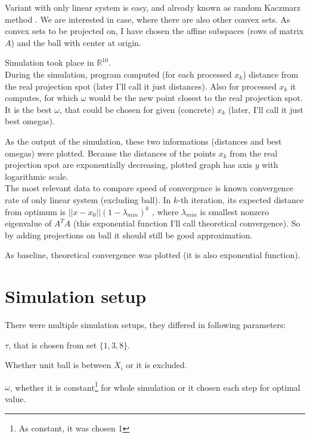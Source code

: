 \documentclass[11pt]{book}
\newcommand{\R}{\mathbb{R}}
\begin{document}
Variant with only linear system is easy, and already known as random Kaczmarz method \cite{kaczmarz} \cite{iterativeLinearSystems}. We are interested in case, where there are also other convex sets. As convex sets to be projected on, I have chosen the affine subspaces (rows of matrix $A$) and the ball with center at origin.

Simulation took place in $\R^{10}$.\\

During the simulation, program computed (for each processed $x_k$) distance from the real projection spot (later I'll call it just distances). Also for processed $x_k$ it computes, for which $\omega$ would be the new point closest to the real projection spot. It is the best $\omega$, that could be chosen for given (concrete) $x_k$ (later, I'll call it just best omegas).

As the output of the simulation, these two informations (distances and best omegas) were plotted. Because the distances of the points $x_k$ from the real projection spot are exponentially decreasing, plotted graph has axis $y$ with logarithmic scale.\\

The most relevant data to compare speed of convergence is known convergence rate of only linear system (excluding ball). In $k$-th iteration, its expected distance from optimum is $||x-x_0||(1-\lambda_{min})^k$ \cite{kaczmarz}, where $\lambda_{min}$ is smallest nonzero eigenvalue of $A^TA$ (this exponential function I'll call theoretical convergence). So by adding projections on ball it should still be good approximation.

As baseline, theoretical convergence was plotted (it is also exponential function).

\section{Simulation setup}

There were multiple simulation setups, they differed in following parameters:

\begin{list}{•}{}
\item $\tau$, that is chosen from set $\{ 1, 3, 8 \}$.
\item Whether unit ball is between $X_i$ or it is excluded.
\item $\omega$, whether it is constant\footnote{As constant, it was chosen 1} for whole simulation or it chosen each step for optimal value.
\end{list}
\end{document}
